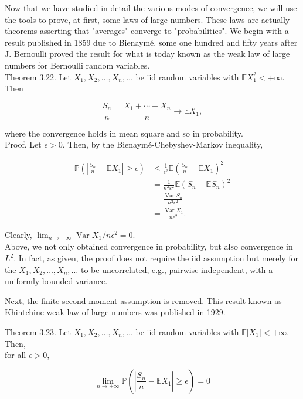 \documentclass[11pt]{amsbook}
\theoremstyle{plain}%
\theoremstyle{definition}
\theoremstyle{remark}
\begin{document}
Now that we have studied in detail the various modes of convergence, we will use the tools to prove, at first, some laws of large numbers. These laws are actually theorems asserting that "averages" converge to "probabilities". We begin with a result published in 1859 due to Bienaymé, some one hundred and fifty years after J. Bernoulli proved the result for what is today known as the weak law of large numbers for Bernoulli random variables.\\
Theorem 3.22. Let $X_{1}, X_{2}, \ldots, X_{n}, \ldots$ be iid random variables with $\mathbb{E} X_{1}^{2}<+\infty$. Then

$$
\frac{S_{n}}{n}=\frac{X_{1}+\cdots+X_{n}}{n} \rightarrow \mathbb{E} X_{1},
$$

where the convergence holds in mean square and so in probability.\\
Proof. Let $\epsilon>0$. Then, by the Bienaymé-Chebyshev-Markov inequality,

$$
\begin{aligned}
\mathbb{P}\left(\left|\frac{S_{n}}{n}-\mathbb{E} X_{1}\right| \geq \epsilon\right) & \leq \frac{1}{\epsilon^{2}} \mathbb{E}\left(\frac{S_{n}}{n}-\mathbb{E} X_{1}\right)^{2} \\
& =\frac{1}{n^{2} \varepsilon^{2}} \mathbb{E}\left(S_{n}-\mathbb{E} S_{n}\right)^{2} \\
& =\frac{\operatorname{Var} S_{n}}{n^{2} \epsilon^{2}} \\
& =\frac{\operatorname{Var} X_{1}}{n \epsilon^{2}} .
\end{aligned}
$$

Clearly, $\lim _{n \rightarrow+\infty} \operatorname{Var} X_{1} / n \epsilon^{2}=0$.\\
Above, we not only obtained convergence in probability, but also convergence in $L^{2}$. In fact, as given, the proof does not require the iid assumption but merely for the $X_{1}, X_{2}, \ldots, X_{n}, \ldots$ to be uncorrelated, e.g., pairwise independent, with a uniformly bounded variance.

Next, the finite second moment assumption is removed. This result known as Khintchine weak law of large numbers was published in 1929.

Theorem 3.23. Let $X_{1}, X_{2}, \ldots, X_{n}, \ldots$ be iid random variables with $\mathbb{E}\left|X_{1}\right|<+\infty$. Then,\\
for all $\epsilon>0$,

$$
\lim _{n \rightarrow+\infty} \mathbb{P}\left(\left|\frac{S_{n}}{n}-\mathbb{E} X_{1}\right| \geq \epsilon\right)=0
$$
\end{document}
